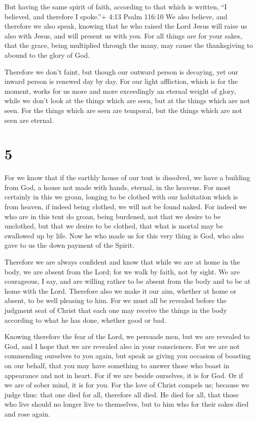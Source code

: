  But having the same spirit of faith, according to that
which is written, ``I believed, and therefore I spoke.''+ 4:13 Psalm
116:10 We also believe, and therefore we also speak, 
knowing that he who raised the Lord Jesus will raise us also with Jesus,
and will present us with you.  For all things are for your
sakes, that the grace, being multiplied through the many, may cause the
thanksgiving to abound to the glory of God.

 Therefore we don't faint, but though our outward person is
decaying, yet our inward person is renewed day by day.  For
our light affliction, which is for the moment, works for us more and
more exceedingly an eternal weight of glory,  while we
don't look at the things which are seen, but at the things which are not
seen. For the things which are seen are temporal, but the things which
are not seen are eternal.

\hypertarget{section-4}{%
\section{5}\label{section-4}}

 For we know that if the earthly house of our tent is
dissolved, we have a building from God, a house not made with hands,
eternal, in the heavens.  For most certainly in this we
groan, longing to be clothed with our habitation which is from heaven,
 if indeed being clothed, we will not be found naked.
 For indeed we who are in this tent do groan, being
burdened, not that we desire to be unclothed, but that we desire to be
clothed, that what is mortal may be swallowed up by life. 
Now he who made us for this very thing is God, who also gave to us the
down payment of the Spirit.

 Therefore we are always confident and know that while we
are at home in the body, we are absent from the Lord;  for
we walk by faith, not by sight.  We are courageous, I say,
and are willing rather to be absent from the body and to be at home with
the Lord.  Therefore also we make it our aim, whether at
home or absent, to be well pleasing to him.  For we must
all be revealed before the judgment seat of Christ that each one may
receive the things in the body according to what he has done, whether
good or bad.

 Knowing therefore the fear of the Lord, we persuade men,
but we are revealed to God, and I hope that we are revealed also in your
consciences.  For we are not commending ourselves to you
again, but speak as giving you occasion of boasting on our behalf, that
you may have something to answer those who boast in appearance and not
in heart.  For if we are beside ourselves, it is for God.
Or if we are of sober mind, it is for you.  For the love of
Christ compels us; because we judge thus: that one died for all,
therefore all died.  He died for all, that those who live
should no longer live to themselves, but to him who for their sakes died
and rose again.

